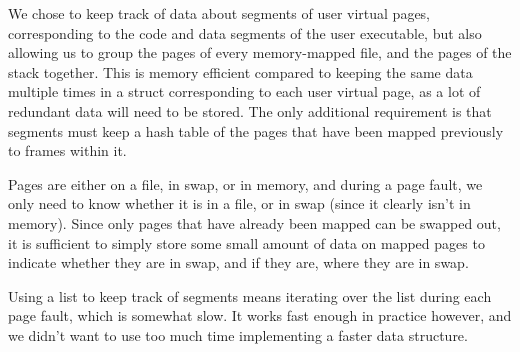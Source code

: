 
We chose to keep track of data about segments of user virtual pages,
corresponding to the code and data segments of the user executable, but also
allowing us to group the pages of every memory-mapped file, and the pages of the
stack together. This is memory efficient compared to keeping the same data
multiple times in a struct corresponding to each user virtual page, as a lot of
redundant data will need to be stored. The only additional requirement is that
segments must keep a hash table of the pages that have been mapped previously to
frames within it.

Pages are either on a file, in swap, or in memory, and during a page fault, we
only need to know whether it is in a file, or in swap (since it clearly isn't in
memory). Since only pages that have already been mapped can be swapped out, it
is sufficient to simply store some small amount of data on mapped pages to
indicate whether they are in swap, and if they are, where they are in swap.

Using a list to keep track of segments means iterating over the list during each
page fault, which is somewhat slow. It works fast enough in practice however,
and we didn't want to use too much time implementing a faster data structure.
